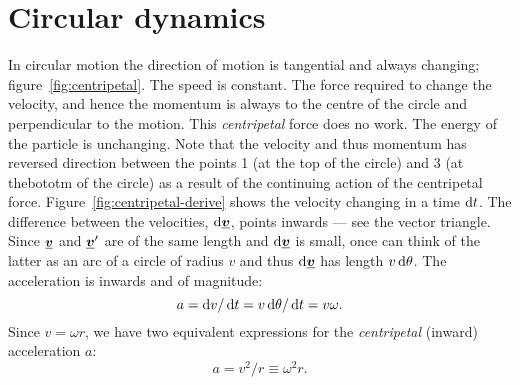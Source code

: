 \vspace{-.75cm}
\section{Circular dynamics}
In circular motion the direction of motion is tangential and always changing; figure~\ref{fig:centripetal}.
The speed is constant.  The force required to change the velocity, and hence the momentum is always to the centre of the circle and perpendicular to the motion.  This \textit{centripetal} force does no work.  The energy of the particle is unchanging.  Note that the velocity and thus momentum has reversed direction between the points 1 (at the top of the circle) and 3 (at thebototm of the circle) as a result of the continuing action of the centripetal force.\nll
Figure~\ref{fig:centripetal-derive} shows the velocity changing in a time $\operatorname{d}\! t$.
The difference between the velocities, $\operatorname{d}\! \mathit{\underline{\boldsymbol{v}}}$, points inwards --- see the vector triangle.  Since $\mathit{\underline{\boldsymbol{v}}}$ and $\mathit{\underline{\boldsymbol{v}}}'$ are of the same length and $\operatorname{d}\!\mathit{\underline{\boldsymbol{v}}}$ is small, once can think of the latter as an arc of a circle of radius $v$ and thus $\operatorname{d}\!\mathit{\underline{\boldsymbol{v}}}$ has length $v \operatorname{d}\!\theta$.  The acceleration is inwards and of magnitude:  \begin{equation*} a = \operatorname{d}\! v/\operatorname{d}\! t = v \operatorname{d}\!\theta/\operatorname{d}\! t = v \omega .
\end{equation*}
Since $v = \omega r$,  we have two equivalent expressions for the \textit{centripetal} (inward) acceleration $a$:
\begin{equation*} a = v^2/r \equiv  \omega^2 r .
\end{equation*}

